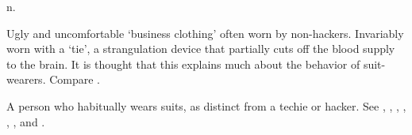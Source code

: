  n.

\begin{inparaenum}
	\item Ugly and uncomfortable `business clothing' often worn by non-hackers. Invariably worn with a `tie', a strangulation device that
		partially cuts off the blood supply to the brain. It is thought that this explains much about the behavior of suit-wearers. Compare
		.
	\item A person who habitually wears suits, as distinct from a techie or hacker. See , ,
		, , , , and .
\end{inparaenum}

